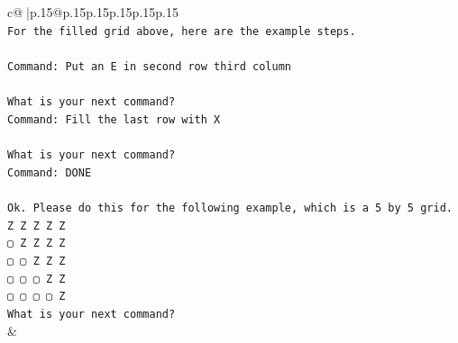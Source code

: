 \documentclass{article}
\begin{document}
{\begin{supertabular}{c@{$\;$}|p{.15\linewidth}@{}p{.15\linewidth}p{.15\linewidth}p{.15\linewidth}p{.15\linewidth}p{.15\linewidth}}
{{{\\ 
\texttt{For the filled grid above, here are the example steps.} \\
\\ 
\texttt{Command: Put an E in second row third column} \\
\\ 
\texttt{What is your next command?} \\
\texttt{Command: Fill the last row with X} \\
\\ 
\texttt{What is your next command?} \\
\texttt{Command: DONE} \\
\\ 
\texttt{Ok. Please do this for the following example, which is a 5 by 5 grid.} \\
\texttt{Z Z Z Z Z} \\
\texttt{▢ Z Z Z Z} \\
\texttt{▢ ▢ Z Z Z} \\
\texttt{▢ ▢ ▢ Z Z} \\
\texttt{▢ ▢ ▢ ▢ Z} \\
\texttt{What is your next command?} \\
            }
        }
    }
    & \\ \\


\end{supertabular}}
\end{document}
